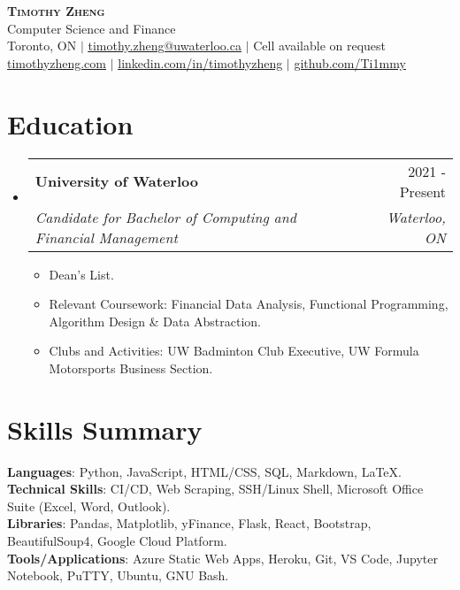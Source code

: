 \documentclass[letterpaper,11pt]{article}
\makeatletter
\newcommand{\resumeItem}[1]{
  \item\small{
    {#1 \vspace{-2pt}}
  }
}
\newcommand{\resumeSubheading}[4]{
  \vspace{-2pt}\item
    \begin{tabular*}{0.97\textwidth}[t]{l@{\extracolsep{\fill}}r}
      \textbf{#1} & #2 \\
      \textit{\small#3} & \textit{\small #4} \\
    \end{tabular*}\vspace{-7pt}
}
\newcommand{\resumeSubHeadingListStart}{\begin{itemize}[leftmargin=0.15in, label={}]}
\newcommand{\resumeSubHeadingListEnd}{\end{itemize}}
\newcommand{\resumeItemListStart}{\begin{itemize}}
\newcommand{\resumeItemListEnd}{\end{itemize}\vspace{-5pt}}
\makeatother
\begin{document}


\begin{center}
    \textbf{\Huge \scshape Timothy Zheng} \\ \vspace{2pt}
    \small Computer Science and Finance \\
    \small Toronto, ON $|$ 
    \href{mailto:timothy.zheng@uwaterloo.ca}{\underline{timothy.zheng@uwaterloo.ca}} $|$ 
    \small Cell available on request
    \\ \vspace{2pt}
    \href{https://timothyzheng.com}{\underline{timothyzheng.com}} $| $
    \href{https://linkedin.com/in/timothyzheng}{\underline{linkedin.com/in/timothyzheng}} $|$
    \href{https://github.com/Ti1mmy}{\underline{github.com/Ti1mmy}}
\end{center}

\section{Education}
  \resumeSubHeadingListStart
    \resumeSubheading
      {University of Waterloo}{2021 - Present}
      {Candidate for Bachelor of Computing and Financial
Management}{Waterloo, ON}
          \resumeItemListStart
            \resumeItem{Dean's List.}
            \resumeItem{Relevant Coursework: Financial Data Analysis, Functional Programming, Algorithm Design \& Data Abstraction.}
            \resumeItem{Clubs and Activities: UW Badminton Club Executive, UW Formula Motorsports Business Section.}

            
        \resumeItemListEnd

  \resumeSubHeadingListEnd

\section{Skills Summary}
 \begin{itemize}[leftmargin=0.15in, label={}]
    \small{\item{
     \textbf{Languages}{: Python, JavaScript, HTML/CSS, SQL, Markdown, LaTeX.} \\
     \textbf{Technical Skills}{: CI/CD, Web Scraping, SSH/Linux Shell, Microsoft Office Suite (Excel, Word, Outlook).} \\
     \textbf{Libraries}{: Pandas, Matplotlib, yFinance, Flask, React, Bootstrap, BeautifulSoup4, Google Cloud Platform.} \\
     \textbf{Tools/Applications}{: Azure Static Web Apps, Heroku, Git, VS Code, Jupyter Notebook, PuTTY, Ubuntu, GNU Bash.}
    }}
 \end{itemize}
\end{document}
